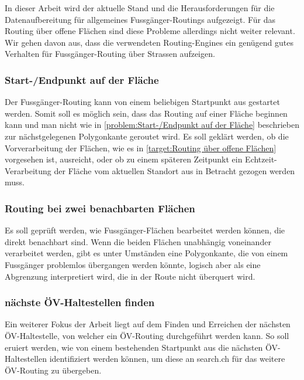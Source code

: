 In dieser Arbeit wird der aktuelle Stand und die Herausforderungen für die Datenaufbereitung für allgemeines Fussgänger-Routings aufgezeigt. Für das Routing über offene Flächen sind diese Probleme allerdings nicht weiter relevant. Wir gehen davon aus, dass die verwendeten \glspl{Routing-Engine} ein genügend gutes Verhalten für Fussgänger-Routing über Strassen aufzeigen.

\subsubsection{Start-/Endpunkt auf der Fläche}
\label{target:Start-/Endpunkt auf der Fläche}
Der Fussgänger-Routing kann von einem beliebigen Startpunkt aus gestartet werden. Somit soll es möglich sein, dass das Routing auf einer Fläche beginnen kann und man nicht wie in \ref{problem:Start-/Endpunkt auf der Fläche} beschrieben zur nächstgelegenen Polygonkante geroutet wird. Es soll geklärt werden, ob die Vorverarbeitung der Flächen, wie es in \ref{target:Routing über offene Flächen} vorgesehen ist, ausreicht, oder ob zu einem späteren Zeitpunkt ein Echtzeit-Verarbeitung der Fläche vom aktuellen Standort aus in Betracht gezogen werden muss.

\subsubsection{Routing bei zwei benachbarten Flächen}
\label{target:Routing bei zwei benachbarten Flächen}

Es soll geprüft werden, wie Fussgänger-Flächen bearbeitet werden können, die direkt benachbart sind. Wenn die beiden Flächen unabhängig voneinander verarbeitet werden, gibt es unter Umständen eine Polygonkante, die von einem Fussgänger problemlos übergangen werden könnte, logisch aber als eine Abgrenzung interpretiert wird, die in der Route nicht überquert wird.

\subsubsection{nächste ÖV-Haltestellen finden}
\label{target:nächste ÖV-Haltestellen finden}
Ein weiterer Fokus der Arbeit liegt auf dem Finden und Erreichen der nächsten ÖV-Haltestelle, von welcher ein ÖV-Routing durchgeführt werden kann. So soll eruiert werden, wie von einem bestehenden Startpunkt aus die nächsten ÖV-Haltestellen identifiziert werden können, um diese an search.ch für das weitere ÖV-Routing zu übergeben.

